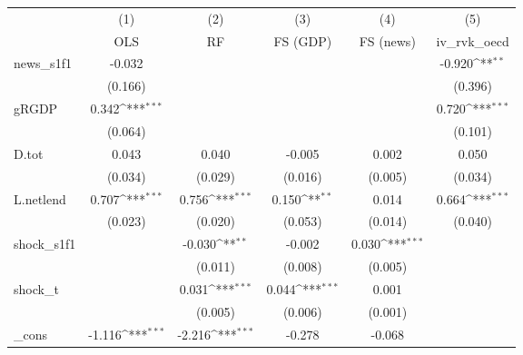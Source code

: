 {
\def\sym#1{\ifmmode^{#1}\else\(^{#1}\)\fi}
\begin{tabular}{l*{5}{c}}
\toprule
            &\multicolumn{1}{c}{(1)}&\multicolumn{1}{c}{(2)}&\multicolumn{1}{c}{(3)}&\multicolumn{1}{c}{(4)}&\multicolumn{1}{c}{(5)}\\
            &\multicolumn{1}{c}{OLS}&\multicolumn{1}{c}{RF}&\multicolumn{1}{c}{FS (GDP)}&\multicolumn{1}{c}{FS (news)}&\multicolumn{1}{c}{iv\_rvk\_oecd}\\
\midrule
news\_s1f1   &      -0.032         &                     &                     &                     &      -0.920\sym{**} \\
            &     (0.166)         &                     &                     &                     &     (0.396)         \\
\addlinespace
gRGDP       &       0.342\sym{***}&                     &                     &                     &       0.720\sym{***}\\
            &     (0.064)         &                     &                     &                     &     (0.101)         \\
\addlinespace
D.tot       &       0.043         &       0.040         &      -0.005         &       0.002         &       0.050         \\
            &     (0.034)         &     (0.029)         &     (0.016)         &     (0.005)         &     (0.034)         \\
\addlinespace
L.netlend   &       0.707\sym{***}&       0.756\sym{***}&       0.150\sym{**} &       0.014         &       0.664\sym{***}\\
            &     (0.023)         &     (0.020)         &     (0.053)         &     (0.014)         &     (0.040)         \\
\addlinespace
shock\_s1f1  &                     &      -0.030\sym{**} &      -0.002         &       0.030\sym{***}&                     \\
            &                     &     (0.011)         &     (0.008)         &     (0.005)         &                     \\
\addlinespace
shock\_t     &                     &       0.031\sym{***}&       0.044\sym{***}&       0.001         &                     \\
            &                     &     (0.005)         &     (0.006)         &     (0.001)         &                     \\
\addlinespace
\_cons      &      -1.116\sym{***}&      -2.216\sym{***}&      -0.278         &      -0.068         &                     \\

\end{tabular}}
